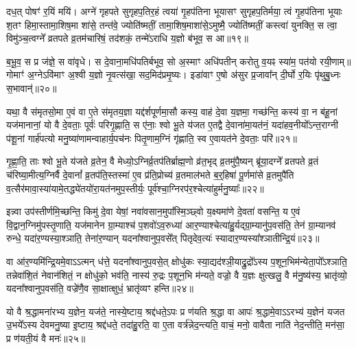 दध॒त् पोषꣳ॑ र॒यिं मयि॑। अग्ने॑ गृहपते सुगृहप॒तिर॒हं त्वया॑ गृ॒हप॑तिना भूयासꣳ सुगृहप॒तिर्मया॒ त्वं गृ॒हप॑तिना भूयाः श॒तꣳ हिमा॒स्तामा॒शिष॒मा शा॑से॒ तन्त॑वे॒ ज्योति॑ष्मतीं॒ तामा॒शिष॒माशा॑से॒\-ऽमुष्मै॒ ज्योति॑ष्मतीं॒ कस्त्वा॑ युनक्ति॒ स त्वा॒ विमु॑ञ्च॒त्वग्ने᳚ व्रतपते व्र॒तम॑चारिषं॒ तद॑शकं॒ तन्मे॑\-ऽराधि य॒ज्ञो ब॑भूव॒ स आ॥१९॥

ब॒भू॒व॒ स प्र ज॑ज्ञे॒ स वा॑वृधे। स दे॒वाना॒मधि॑पतिर्बभूव॒ सो अ॒स्माꣳ अधि॑पतीन् करोतु व॒यꣴ स्या॑म॒ पत॑यो रयी॒णाम्॥ गोमाꣳ॑ अ॒ग्ने\-ऽवि॑माꣳ अ॒श्वी य॒ज्ञो नृ॒वत्स॑खा॒ सद॒मिद॑प्रमृ॒ष्यः। इडा॑वाꣳ ए॒षो अ॑सुर प्र॒जावा᳚न् दी॒र्घो र॒यिः पृ॑थुबु॒ध्नः स॒भावान्॑॥२०॥

{\anuvakamend[{द्वि॒ष्मः सु॒वीर्य॒ꣳ॒ स आ पञ्च॑त्रिꣳशच्च॥६॥}]}

यथा॒ वै स॑मृतसो॒मा ए॒वं वा ए॒ते स॑मृतय॒ज्ञा यद्द॑र्\mbox{}शपूर्णमा॒सौ कस्य॒ वाह॑ दे॒वा य॒ज्ञमा॒ गच्छ॑न्ति॒ कस्य॑ वा॒ न ब॑हू॒नां यज॑मानानां॒ यो वै दे॒वताः॒ पूर्वः॑ परिगृ॒ह्णाति॒ स ए॑नाः॒ श्वो भू॒ते य॑जत ए॒तद्वै दे॒वाना॑मा॒यत॑नं॒ यदा॑हव॒नीयो᳚\-ऽन्त॒राग्नी प॑शू॒नां गार्\mbox{}ह॑पत्यो मनु॒ष्या॑णामन्वाहार्य॒पच॑नः पितृ॒णाम॒ग्निं गृ॑ह्णाति॒ स्व ए॒वायत॑ने दे॒वताः॒ परि॑॥२१॥

गृ॒ह्णा॒ति॒ ताः श्वो भू॒ते य॑जते व्र॒तेन॒ वै मेध्यो॒\-ऽग्निर्व्र॒तप॑तिर्ब्राह्म॒णो व्र॑त॒भृद् व्र॒तमु॑पै॒ष्यन् ब्रू॑या॒दग्ने᳚ व्रतपते व्र॒तं च॑रिष्या॒मीत्य॒ग्निर्वै दे॒वानां᳚ व्र॒तप॑ति॒स्तस्मा॑ ए॒व प्र॑ति॒प्रोच्य॑ व्र॒तमाल॑भते ब॒र्॒\mbox{}हिषा॑ पू॒र्णमा॑से व्र॒तमुपै॑ति व॒त्सैर॑मावा॒स्या॑यामे॒तद्ध्ये॑तयो॑रा॒यत॑नमुप॒स्तीर्यः॒ पूर्व॑श्चा॒ग्निरप॑र॒श्चेत्या॑हुर्मनु॒ष्याः᳚॥२२॥

इन्न्वा उप॑स्तीर्णमि॒च्छन्ति॒ किमु॑ दे॒वा येषां॒ नवा॑वसान॒मुपा᳚स्मि॒ञ्छ्वो य॒क्ष्यमा॑णे दे॒वता॑ वसन्ति॒ य ए॒वं वि॒द्वान॒ग्निमु॑पस्तृ॒णाति॒ यज॑मानेन ग्रा॒म्याश्च॑ प॒शवो॑\-ऽव॒रुध्या॑ आर॒ण्याश्चेत्या॑हु॒र्यद्ग्रा॒म्यानु॑प॒वस॑ति॒ तेन॑ ग्रा॒म्यानव॑ रुन्धे॒ यदा॑र॒ण्यस्या॒श्ञाति॒ तेना॑र॒ण्यान् यदना᳚श्वानुप॒वसे᳚त् पितृदेव॒त्यः॑ स्यादार॒ण्यस्या᳚श्ञातीन्द्रि॒यं॥२३॥

वा आ॑र॒ण्यमि॑न्द्रि॒यमे॒वा\-ऽ\-ऽत्मन् ध॑त्ते॒ यदना᳚श्वानुप॒वसे॒त् क्षोधु॑कः स्या॒द्यद॑श्ञी॒याद्रु॒द्रो᳚\-ऽस्य प॒शून॒भिम॑न्येता॒पो᳚\-ऽश्ञाति॒ तन्नेवा॑शि॒तं नेवान॑शितं॒ न क्षोधु॑को॒ भव॑ति॒ नास्य॑ रु॒द्रः प॒शून॒भि म॑न्यते॒ वज्रो॒ वै य॒ज्ञः क्षुत्खलु॒ वै म॑नु॒ष्य॑स्य॒ भ्रातृ॑व्यो॒ यदना᳚श्वानुप॒वस॑ति॒ वज्रे॑णै॒व सा॒क्षात्क्षुधं॒ भ्रातृ॑व्यꣳ हन्ति॥२४॥

{\anuvakamend[{परि॑ मनु॒ष्या॑ इन्द्रि॒यꣳ सा॒क्षात् त्रीणि॑ च॥७॥}]}

यो वै श्र॒द्धामना॑रभ्य य॒ज्ञेन॒ यज॑ते॒ नास्ये॒ष्टाय॒ श्रद्द॑धते॒\-ऽपः प्र ण॑यति श्र॒द्धा वा आपः॑ श्र॒द्धामे॒वा\-ऽ\-ऽरभ्य॑ य॒ज्ञेन॑ यजत उ॒भये᳚\-ऽस्य देवमनु॒ष्या इ॒ष्टाय॒ श्रद्द॑धते॒ तदा॑हु॒रति॒ वा ए॒ता वर्त्र॑न्नेद॒न्त्यति॒ वाचं॒ मनो॒ वावैता नाति॑ नेद॒न्तीति॒ मन॑सा॒ प्र ण॑यती॒यं वै मनः॑॥२५॥

